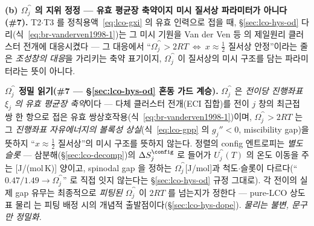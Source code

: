 \textbf{(b) $\Omega_j^\cat$ 의 지위 정정 --- 유효 평균장 축약이지 미시 질서상 파라미터가 아니다(\#7).} T2$\cdot$T3 를
정칙용액~\eqref{eq:lco-gxi} 의 유효 인력으로 접을 때, \S\ref{sec:lco-hys-od} 다리(식~\eqref{eq:br-vanderven1998-1})는
그 미시 기원을 Van der Ven 등\cite{vanderven1998} 의 제일원리 클러스터 전개에 대응시켰다 --- 그 대응에서
``$\Omega_j^\cat\!>\!2RT\ \Leftrightarrow\ x\!\approx\!\tfrac12$ 질서상 안정''이라는 줄은 \emph{조성창의 대응}을
가리키는 축약 표기이지, $\Omega_j^\cat$ 이 질서상의 미시 구조를 담는 파라미터라는 뜻이 아니다.
\begin{warnbox}
\textbf{$\Omega_j^\cat$ 정밀 읽기(\#7 --- \S\ref{sec:lco-hys-od} 혼동 가드 계승).} $\Omega_j^\cat$ 은 \emph{전이당 진행좌표
$\xi_j$ 의 유효 평균장 축약}이다 --- 다체 클러스터 전개(ECI 집합)를 전이 $j$ 창의 최근접 쌍 한 항으로 접은
유효 쌍상호작용(식~\eqref{eq:br-vanderven1998-1})이며, $\Omega_j^\cat\!>\!2RT$ 는 그 \emph{진행좌표 자유에너지의
볼록성 상실}(식~\eqref{eq:lco-gpp} 의 $g_j''\!<\!0$, miscibility gap)을 뜻하지 ``$x\!\approx\!\tfrac12$ 질서상''의
미시 구조를 뜻하지 않는다. 정렬의 config 엔트로피는 \emph{별도 슬롯} --- 삼분해(\S\ref{sec:lco-decomp})의
$\Delta S_j^\config$ 로 들어가 $U_j^\cat(T)$ 의 온도 이동을 주는 [J/(mol\,K)] 양이고, spinodal gap 을 정하는
$\Omega_j^\cat$[J/mol]과 척도$\cdot$슬롯이 다르다(``$0.47/1.49\!\to\!\Omega_j^\cat$'' 로 직접 잇지 않는다는
\S\ref{sec:lco-hys-od} 규정 그대로). 각 전이의 실제 gap 유무는 최종적으로 \emph{피팅된} $\Omega_j^\cat$ 이 $2RT$ 를
넘는지가 정한다 --- pure-LCO 상도표 물리\cite{reimers1992,vanderven1998,ml2024} 는 피팅 배정 시의 개념적
출발점이다(\S\ref{sec:lco-hys-dope}). \emph{물리는 불변, 문구만 정밀화.}
\end{warnbox}

